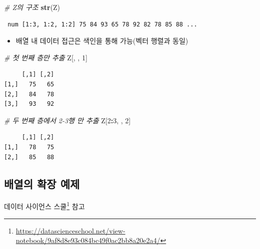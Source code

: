 \documentclass[
  11pt,
]{krantz}
\makeatletter
\newenvironment{Shaded}{\begin{snugshade}}{\end{snugshade}}
\newcommand{\CommentTok}[1]{\textcolor[rgb]{0.37,0.37,0.37}{\textit{#1}}}
\newcommand{\DecValTok}[1]{\textcolor[rgb]{0.06,0.06,0.06}{#1}}
\newcommand{\KeywordTok}[1]{\textcolor[rgb]{0.27,0.27,0.27}{\textbf{#1}}}
\newcommand{\NormalTok}[1]{#1}
\newcommand{\OperatorTok}[1]{\textcolor[rgb]{0.43,0.43,0.43}{\textbf{#1}}}
\providecommand{\tightlist}{%
  \setlength{\itemsep}{0pt}\setlength{\parskip}{0pt}}
\renewcommand{\href}[2]{#2\footnote{\url{#1}}}
\newenvironment{kframe}{%
\medskip{}
\setlength{\fboxsep}{.8em}
 \def\at@end@of@kframe{}%
 \ifinner\ifhmode%
  \def\at@end@of@kframe{\end{minipage}}%
  \begin{minipage}{\columnwidth}%
 \fi\fi%
 \def\FrameCommand##1{\hskip\@totalleftmargin \hskip-\fboxsep
 \colorbox{shadecolor}{##1}\hskip-\fboxsep
     \hskip-\linewidth \hskip-\@totalleftmargin \hskip\columnwidth}%
 \MakeFramed {\advance\hsize-\width
   \@totalleftmargin\z@ \linewidth\hsize
   \@setminipage}}%
 {\par\unskip\endMakeFramed%
 \at@end@of@kframe}
\renewenvironment{quote}{\begin{kframe}}{\end{kframe}}
\makeatother
\begin{document}
\begin{Shaded}
\begin{Highlighting}[]
\CommentTok{# Z의 구조}
\KeywordTok{str}\NormalTok{(Z)}
\end{Highlighting}
\end{Shaded}

\begin{verbatim}
 num [1:3, 1:2, 1:2] 75 84 93 65 78 92 82 78 85 88 ...
\end{verbatim}

\normalsize

\begin{itemize}
\tightlist
\item
  배열 내 데이터 접근은 색인을 통해 가능(벡터 행렬과 동일)
\end{itemize}

\footnotesize

\begin{Shaded}
\begin{Highlighting}[]
\CommentTok{# 첫 번째 층만 추출}
\NormalTok{Z[, , }\DecValTok{1}\NormalTok{]}
\end{Highlighting}
\end{Shaded}

\begin{verbatim}
     [,1] [,2]
[1,]   75   65
[2,]   84   78
[3,]   93   92
\end{verbatim}

\begin{Shaded}
\begin{Highlighting}[]
\CommentTok{# 두 번째 층에서 2-3행 만 추출}
\NormalTok{Z[}\DecValTok{2}\OperatorTok{:}\DecValTok{3}\NormalTok{, , }\DecValTok{2}\NormalTok{]}
\end{Highlighting}
\end{Shaded}

\begin{verbatim}
     [,1] [,2]
[1,]   78   75
[2,]   85   88
\end{verbatim}

\normalsize

\hypertarget{rray-extend-example}{%
\subsection{배열의 확장 예제}\label{rray-extend-example}}

\begin{quote}
\href{https://datascienceschool.net/view-notebook/9af8d8e93c084bc49f0ac2bb8a20e2a4/}{데이터 사이언스 스쿨} 참고
\end{quote}
\end{document}
